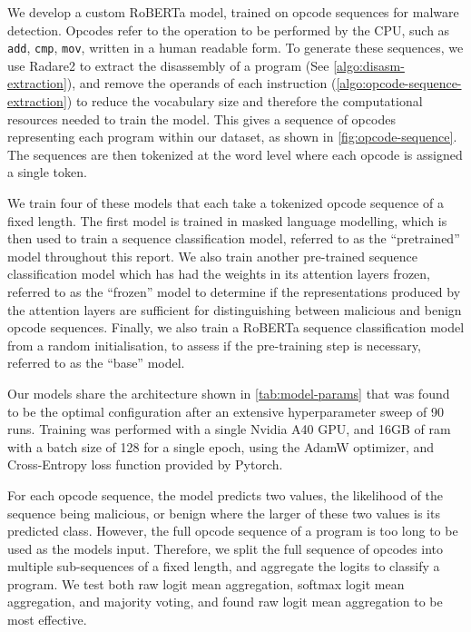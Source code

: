 \documentclass[main.tex]{subfiles}
\begin{document}
We develop a custom RoBERTa model, trained on opcode sequences for malware detection. Opcodes refer to the operation to be performed by the CPU, such as \texttt{add}, \texttt{cmp}, \texttt{mov}, written in a human readable form. To generate these sequences, we use Radare2 to extract the disassembly of a program (See \cref{algo:disasm-extraction}), and remove the operands of each instruction (\cref{algo:opcode-sequence-extraction}) to reduce the vocabulary size and therefore the computational resources needed to train the model. This gives a sequence of opcodes representing each program within our dataset, as shown in \cref{fig:opcode-sequence}. The sequences are then tokenized at the word level where each opcode is assigned a single token. 

We train four of these models that each take a tokenized opcode sequence of a fixed length. The first model is trained in masked language modelling, which is then used to train a sequence classification model, referred to as the ``pretrained'' model throughout this report. We also train another pre-trained sequence classification model which has had the weights in its attention layers frozen, referred to as the ``frozen'' model to determine if the representations produced by the attention layers are sufficient for distinguishing between malicious and benign opcode sequences. Finally, we also train a RoBERTa sequence classification model from a random initialisation, to assess if the pre-training step is necessary, referred to as the ``base'' model.  

Our models share the architecture shown in \cref{tab:model-params} that was found to be the optimal configuration after an extensive hyperparameter sweep of 90 runs. Training was performed with a single Nvidia A40 GPU, and 16GB of ram with a batch size of 128 for a single epoch, using the AdamW optimizer, and Cross-Entropy loss function provided by Pytorch.

For each opcode sequence, the model predicts two values, the likelihood of the sequence being malicious, or benign where the larger of these two values is its predicted class. However, the full opcode sequence of a program is too long to be used as the models input. Therefore, we split the full sequence of opcodes into multiple sub-sequences of a fixed length, and aggregate the logits to classify a program. We test both raw logit mean aggregation, softmax logit mean aggregation, and majority voting, and found raw logit mean aggregation to be most effective. 
\end{document}
